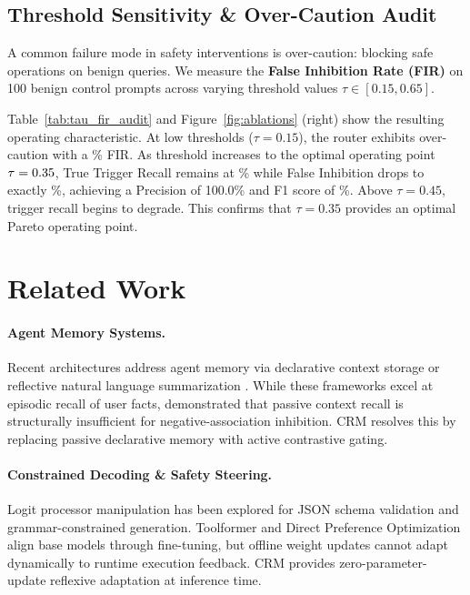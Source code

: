 \documentclass[10pt,conference]{IEEEtran}
\begin{document}


\subsection{Threshold Sensitivity \& Over-Caution Audit}

A common failure mode in safety interventions is over-caution: blocking safe operations on benign queries. We measure the \textbf{False Inhibition Rate (FIR)} on 100 benign control prompts across varying threshold values $\tau \in [0.15, 0.65]$.

Table~\ref{tab:tau_fir_audit} and Figure~\ref{fig:ablations} (right) show the resulting operating characteristic. At low thresholds ($\tau = 0.15$), the router exhibits over-caution with a \ValOptimalTauFIR\% FIR. As threshold increases to the optimal operating point $\tau = 0.35$, True Trigger Recall remains at \ValOptimalTauRecall\% while False Inhibition drops to exactly \ValOptimalTauFIR\%, achieving a Precision of 100.0\% and F1 score of \ValOptimalTauFOne\%. Above $\tau = 0.45$, trigger recall begins to degrade. This confirms that $\tau = 0.35$ provides an optimal Pareto operating point.



\section{Related Work}

\paragraph{Agent Memory Systems.}
Recent architectures address agent memory via declarative context storage \citep{packer2023memgpt,chhikara2024mem0} or reflective natural language summarization \citep{shinn2023reflexion}. While these frameworks excel at episodic recall of user facts, \citet{qin2026implicitmembench} demonstrated that passive context recall is structurally insufficient for negative-association inhibition. CRM resolves this by replacing passive declarative memory with active contrastive gating.

\paragraph{Constrained Decoding \& Safety Steering.}
Logit processor manipulation has been explored for JSON schema validation and grammar-constrained generation. Toolformer \citep{schick2023toolformer} and Direct Preference Optimization \citep{rafailov2023direct} align base models through fine-tuning, but offline weight updates cannot adapt dynamically to runtime execution feedback. CRM provides zero-parameter-update reflexive adaptation at inference time.
\end{document}

